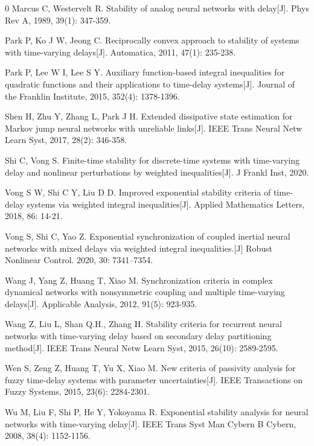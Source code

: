 \documentclass[a4paper, 12pt, oneside]{article}
\theoremstyle{cn_theorem}
\begin{document}
{\begin{thebibliography}{0}
 Marcus C, Westervelt R. Stability of analog neural networks with delay[J]. Phys Rev A, 1989, 39(1): 347-359.

 Park P, Ko J W, Jeong C. Reciprocally convex approach to stability of systems with time-varying delays[J]. Automatica, 2011, 47(1): 235-238.

 Park P, Lee W I, Lee S Y. Auxiliary function-based integral inequalities for quadratic functions and their applications to time-delay systems[J]. Journal of the Franklin Institute, 2015, 352(4): 1378-1396.

 Shen H, Zhu Y, Zhang L, Park J H. Extended dissipative state estimation for Markov jump neural networks with unreliable links[J]. IEEE Trans Neural Netw Learn Syst, 2017, 28(2): 346-358.

 Shi C, Vong S. Finite-time stability for discrete-time systems with time-varying delay and nonlinear perturbations by weighted inequalities[J]. J Frankl Inst, 2020.

 Vong S W, Shi C Y, Liu D D. Improved exponential stability criteria of time-delay systems via weighted integral inequalities[J]. Applied Mathematics Letters, 2018, 86: 14-21.

 Vong S, Shi C, Yao Z. Exponential synchronization of coupled inertial neural networks with mixed delays via weighted integral inequalities.[J] Robust Nonlinear Control. 2020, 30: 7341–7354.

 Wang J, Yang Z, Huang T, Xiao M. Synchronization criteria in complex dynamical networks with nonsymmetric coupling and multiple time-varying delays[J]. Applicable Analysis, 2012, 91(5): 923-935.

 Wang Z, Liu L, Shan Q.H., Zhang H. Stability criteria for recurrent neural networks with time-varying delay based on secondary delay partitioning method[J]. IEEE Trans Neural Netw Learn Syst, 2015, 26(10): 2589-2595.

 Wen S, Zeng Z, Huang T, Yu X, Xiao M. New criteria of passivity analysis for fuzzy time-delay systems with parameter uncertainties[J]. IEEE Transactions on Fuzzy Systems, 2015, 23(6): 2284-2301.

 Wu M, Liu F, Shi P, He Y, Yokoyama R. Exponential stability analysis for neural networks with time-varying delay[J]. IEEE Trans Syst Man Cybern B Cybern, 2008, 38(4): 1152-1156.


\end{thebibliography}}
\end{document}
